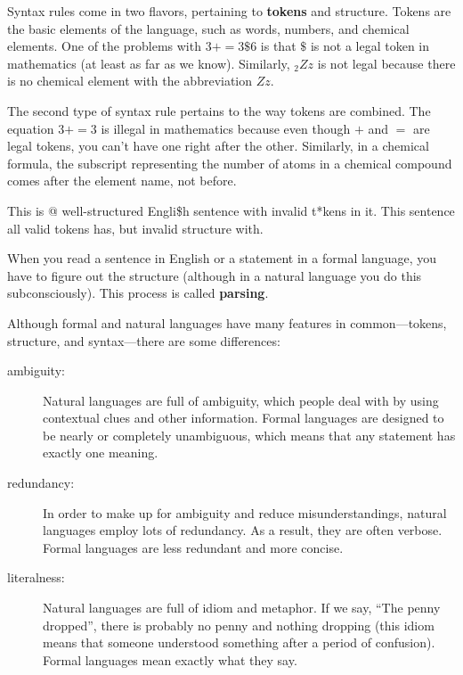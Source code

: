 Syntax rules come in two flavors, pertaining to {\bf tokens} and
structure.  Tokens are the basic elements of the language, such as
words, numbers, and chemical elements.  One of the problems with
$3 += 3 \$ 6$ is that \( \$ \) is not a legal token in mathematics
(at least as far as we know).  Similarly, $_2Zz$ is not legal because
there is no chemical element with the abbreviation $Zz$.

The second type of syntax rule pertains to the way tokens are
combined.  The equation $3 += 3$ is illegal in mathematics 
because even though $+$ and $=$ are legal tokens, you can't 
have one right after the other. Similarly, in a chemical formula, 
the subscript representing the number of atoms in a 
chemical compound comes after the element name, not before.

This is @ well-structured Engli\$h
sentence with invalid t*kens in it.  This sentence all valid 
tokens has, but invalid structure with.

When you read a sentence in English or a statement in a formal
language, you have to figure out the structure
(although in a natural language you do this subconsciously).  This
process is called {\bf parsing}.

Although formal and natural languages have many features in
common---tokens, structure, and syntax---there are some
differences:

\begin{description}

\item[ambiguity:] Natural languages are full of ambiguity, which
people deal with by using contextual clues and other information.
Formal languages are designed to be nearly or completely unambiguous,
which means that any statement has exactly one meaning. 

\item[redundancy:] In order to make up for ambiguity and reduce
misunderstandings, natural languages employ lots of
redundancy.  As a result, they are often verbose.  Formal languages
are less redundant and more concise.

\item[literalness:] Natural languages are full of idiom and metaphor.
If we say, ``The penny dropped'', there is probably no penny and
nothing dropping (this idiom means that someone understood something
after a period of confusion).  Formal languages
mean exactly what they say.

\end{description}

